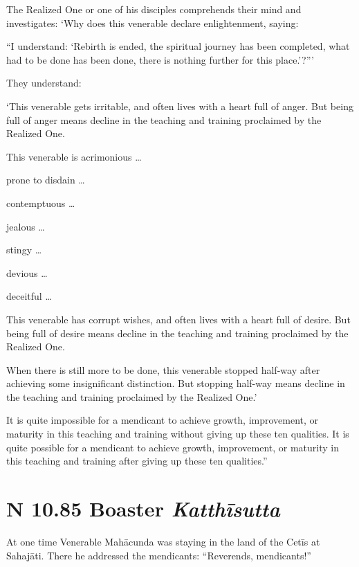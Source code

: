 \documentclass[12pt,openany]{book}%
\newcommand*{\suttatitleacronym}[1]{\smaller[2]{#1}\vspace*{.3em}}
\newcommand*{\suttatitletranslation}[1]{\linebreak{#1}}
\newcommand*{\suttatitleroot}[1]{\linebreak\smaller[2]\itshape{#1}}
\newcommand*{\tocacronym}[1]{\hspace*{-3.3em}{#1}\quad}
\newcommand*{\toctranslation}[1]{#1}
\newcommand*{\tocroot}[1]{(\textit{#1})}
\begin{document}
The Realized One or one of his disciples comprehends their mind and investigates: ‘Why does this venerable declare enlightenment, saying: 

“I understand: ‘Rebirth is ended, the spiritual journey has been completed, what had to be done has been done, there is nothing further for this place.’?”’ 

They understand: 

‘This venerable gets irritable, and often lives with a heart full of anger. But being full of anger means decline in the teaching and training proclaimed by the Realized One. 

This venerable is acrimonious … 

prone to disdain … 

contemptuous … 

jealous … 

stingy … 

devious … 

deceitful … 

This venerable has corrupt wishes, and often lives with a heart full of desire. But being full of desire means decline in the teaching and training proclaimed by the Realized One. 

When there is still more to be done, this venerable stopped half-way after achieving some insignificant distinction. But stopping half-way means decline in the teaching and training proclaimed by the Realized One.’ 

It is quite impossible for a mendicant to achieve growth, improvement, or maturity in this teaching and training without giving up these ten qualities. It is quite possible for a mendicant to achieve growth, improvement, or maturity in this teaching and training after giving up these ten qualities.” 

%
\section*{{\suttatitleacronym AN 10.85}{\suttatitletranslation A Boaster }{\suttatitleroot Katthīsutta}}
\addcontentsline{toc}{section}{\tocacronym{AN 10.85} \toctranslation{A Boaster } \tocroot{Katthīsutta}}

At one time Venerable \textsanskrit{Mahācunda} was staying in the land of the \textsanskrit{Cetīs} at \textsanskrit{Sahajāti}. There he addressed the mendicants: “Reverends, mendicants!” 
\end{document}
